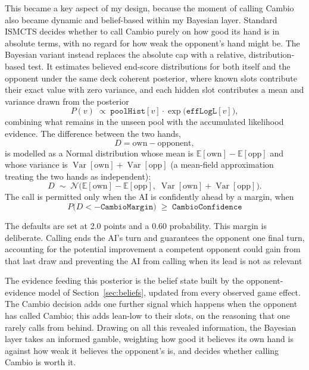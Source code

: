 \documentclass[12pt,a4paper,oneside]{report}
\begin{document}
This became a key aspect of my design, because the moment of calling Cambio also
became dynamic and belief-based within my Bayesian layer. Standard ISMCTS decides
whether to call Cambio purely on how good its hand is in absolute terms, with no
regard for how weak the opponent's hand might be. The Bayesian variant instead
replaces the absolute cap with a relative, distribution-based test. It estimates
believed end-score distributions for both itself and the opponent under the same
deck coherent posterior, where known slots contribute their exact value with zero
variance, and each hidden slot contributes a mean and variance drawn from the
posterior
%
\begin{equation}
  P(v) \;\propto\; \texttt{poolHist}[v]\cdot\exp\!\big(\texttt{effLogL}[v]\big),
\end{equation}
%
combining what remains in the unseen pool with the accumulated likelihood
evidence. The difference between the two hands,
%
\begin{equation}
  D = \text{own} - \text{opponent},
\end{equation}
%
is modelled as a Normal distribution whose mean is $\mathbb{E}[\text{own}] -
\mathbb{E}[\text{opp}]$ and whose variance is $\operatorname{Var}[\text{own}] +
\operatorname{Var}[\text{opp}]$ (a mean-field approximation treating the two hands
as independent):
%
\begin{equation}
  D \;\sim\; \mathcal{N}\!\Big(
    \mathbb{E}[\text{own}] - \mathbb{E}[\text{opp}],\;
    \operatorname{Var}[\text{own}] + \operatorname{Var}[\text{opp}]
  \Big).
\end{equation}
%
The call is permitted only when the AI is confidently ahead by a margin, when
%
\begin{equation}
  P\big(D < -\texttt{CambioMargin}\big) \;\ge\; \texttt{CambioConfidence}
\end{equation}
%

The defaults are set at 2.0 points and a 0.60 probability. This margin is deliberate. Calling ends the AI’s turn and guarantees the opponent one final turn, accounting for the potential improvement a competent opponent could gain from that last draw and preventing the AI from calling when its lead is not as relevant

The evidence feeding this posterior is the belief state built by the
opponent-evidence model of Section~\ref{sec:beliefs}, updated from every observed
game effect. The Cambio decision adds one further signal which happens when the
opponent has called Cambio; this adds lean-low to their slots, on the reasoning that one rarely calls from behind. Drawing on all this revealed information, the Bayesian layer takes an informed gamble, weighting how good it believes its own hand is against how weak it believes the opponent's is, and decides whether calling Cambio is worth it.
\end{document}
